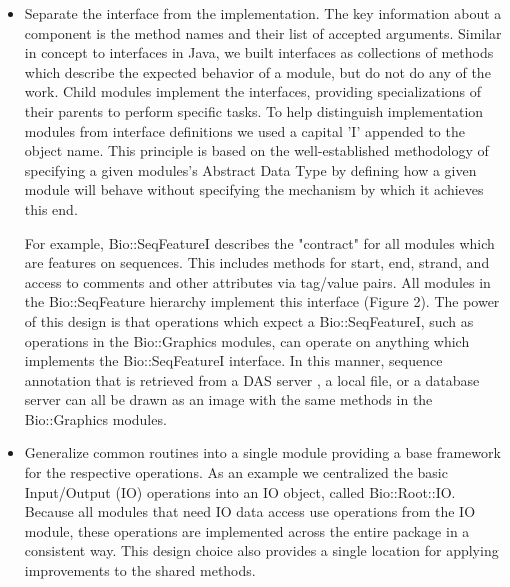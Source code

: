 \documentclass[12pt]{article}
\begin{document}
\begin{itemize}

\item Separate the interface from the implementation.  The key
information about a component is the method names and their list of
accepted arguments.  Similar in concept to interfaces in Java, we
built interfaces as collections of methods which describe the expected
behavior of a module, but do not do any of the work.  Child modules
implement the interfaces, providing specializations of their parents
to perform specific tasks.  To help distinguish implementation modules
from interface definitions we used a capital 'I' appended to the
object name.  This principle is based on the well-established
methodology of specifying a given modules's Abstract Data Type by
defining how a given module will behave without specifying the
mechanism by which it achieves this end.

For example, Bio::SeqFeatureI describes the "contract" for all modules
which are features on sequences.  This includes methods for
start, end, strand, and access to comments and other attributes via tag/value
pairs.  All modules in the Bio::SeqFeature hierarchy implement this
interface (Figure 2).  The power of this design is that operations
which expect a Bio::SeqFeatureI, such as operations in the
Bio::Graphics modules, can operate on anything which implements the
Bio::SeqFeatureI interface.  In this manner, sequence annotation that
is retrieved from a DAS server \cite{das}, a local file, or a database
server can all be drawn as an image with the same methods in the
Bio::Graphics modules.

\item Generalize common routines into a single module providing a base
framework for the respective operations.  As an example we centralized
the basic Input/Output (IO) operations into an IO object, called
Bio::Root::IO.  Because all modules that need IO data access use
operations from the IO module, these operations are implemented across
the entire package in a consistent way.  This design choice also
provides a single location for applying improvements to the shared
methods.  


\end{itemize}
\end{document}
